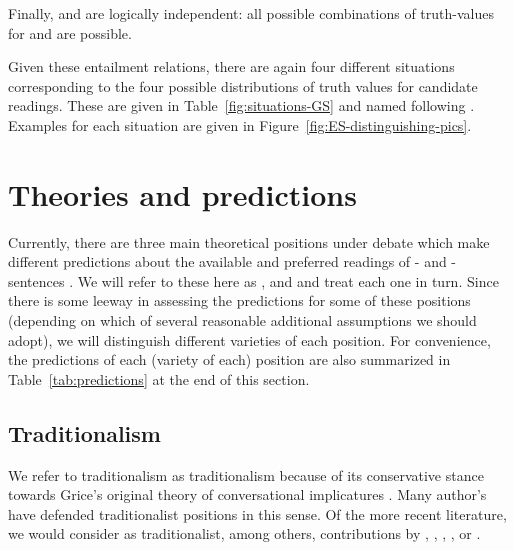 \documentclass[fleqn,reqno,10pt,draft]{article}
\newcommand{\lit}{\acro{lit}}
\newcommand{\loc}{\acro{loc}}
\newcommand{\as}{\acro{as}}
\renewcommand{\es}{\acro{es}}
\begin{document}
\noindent Finally, \loc and \lit are logically independent: all
possible combinations of truth-values for \loc and \lit are possible.

Given these entailment relations, there are again four different
situations corresponding to the four possible distributions of truth
values for candidate readings. These are given in
Table~\ref{fig:situations-GS} and named following
\citet{ChemlaSpector2010:Experimental-Ev}. Examples for each situation
are given in Figure~\ref{fig:ES-distinguishing-pics}.





\section{Theories and predictions}
\label{sec:theories-predictions}

Currently, there are three main theoretical positions under debate
which make different predictions about the available and preferred
readings of \as- and \es-sentences \citep[c.f.][for
overview]{Horn2006:The-Border-Wars,Geurts2010:Quantity-Implic,Sauerland2012:The-Computation}. We
will refer to these here as ,
 and  and treat each
one in turn. Since there is some leeway in assessing the predictions
for some of these positions (depending on which of several reasonable
additional assumptions we should adopt), we will distinguish different
varieties of each position. For convenience, the predictions of each
(variety of each) position are also summarized in
Table~\ref{tab:predictions} at the end of this section.

\subsection{Traditionalism}
\label{sec:traditionalism}

We refer to traditionalism as traditionalism because of its
conservative stance towards Grice's original theory of conversational
implicatures \citep{Grice1975:Logic-and-Conve}. Many author's have
defended traditionalist positions in this sense. Of the more recent
literature, we would consider as traditionalist, among others,
contributions by \citet{Spector2006:Scalar-Implicat},
\citet{Sauerland2004:Scalar-Implicat},
\citet{Russell2006:Against-Grammat},
\citet{vanRooijSchulz:ExhaustiveInterpretation},
\citet{Geurts2010:Quantity-Implic} or
\citet{Franke2011:Quantity-Implic}.
\end{document}
